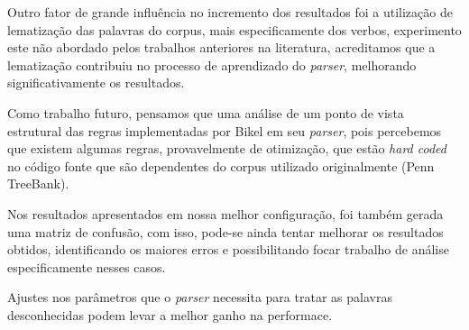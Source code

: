 Outro fator de grande influência no incremento dos resultados foi a utilização de lematização das palavras do corpus, mais especificamente dos verbos, experimento este não abordado pelos trabalhos anteriores na literatura, acreditamos que a lematização contribuiu no processo de aprendizado do \emph{parser}, melhorando significativamente os resultados.

Como trabalho futuro, pensamos que uma análise de um ponto de vista estrutural das regras implementadas por Bikel em seu \emph{parser}, pois percebemos que existem algumas regras, provavelmente de otimização, que estão \emph{hard coded} no código fonte que são dependentes do corpus utilizado originalmente (Penn TreeBank). 

Nos resultados apresentados em nossa melhor configuração, foi também gerada uma matriz de confusão, com isso, pode-se ainda tentar melhorar os resultados obtidos, identificando os maiores erros e possibilitando focar trabalho de análise especificamente nesses casos. 

Ajustes nos parâmetros que o \emph{parser} necessita para tratar as palavras desconhecidas podem levar a melhor ganho na performace.
